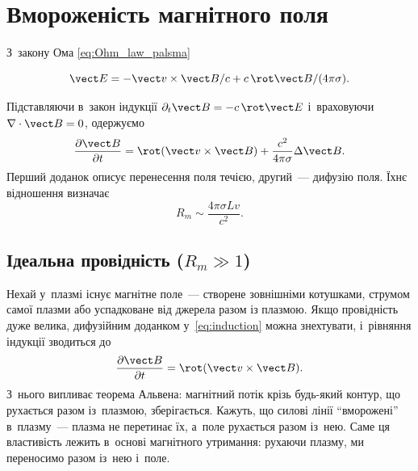 \section{Вмороженість магнітного поля}



З~закону Ома \eqref{eq:Ohm_law_palsma}

\begin{equation*}
	 \vect E=-\vect v\times\vect B/c+c\,\rot\vect
	B/(4\pi\sigma).
\end{equation*}

Підставляючи в~закон індукції $\partial_t\vect B=-c\,\rot\vect E$ і~враховуючи
$\nabla\cdot\vect B=0$, одержуємо 
\begin{equation}\label{eq:induction}
	\frac{\partial\vect B}{\partial t}=\rot(\vect v\times\vect B)+\frac{c^2}{4\pi\sigma}\Delta\vect B.
\end{equation}
Перший доданок описує перенесення поля течією, другий~--- дифузію поля. Їхнє відношення
визначає 
\begin{equation*}
	R_m\sim\frac{4\pi\sigma Lv}{c^2}.
\end{equation*}



\subsection{Ідеальна провідність (\texorpdfstring{$R_m\gg1$}{R_m >> 1})}



Нехай у~плазмі існує магнітне поле~--- створене зовнішніми котушками, струмом самої плазми
або успадковане від джерела разом із плазмою. Якщо провідність дуже велика, дифузійним
доданком у~\eqref{eq:induction} можна знехтувати, і~рівняння індукції зводиться до
\begin{equation*}
    \frac{\partial\vect B}{\partial t}=\rot(\vect v\times\vect B).
\end{equation*}
З~нього випливає теорема Альвена: магнітний потік крізь будь-який контур, що рухається
разом із~плазмою, зберігається. Кажуть, що силові лінії \enquote{вморожені} в~плазму~---
плазма не перетинає їх, а~поле рухається разом із~нею. Саме ця властивість лежить в~основі
магнітного утримання: рухаючи плазму, ми переносимо разом із~нею і~поле.



